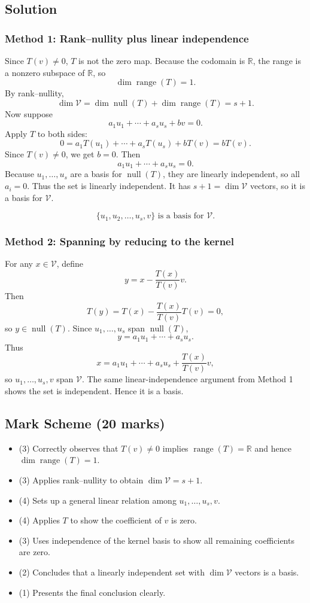 \documentclass[12pt]{article}
\newcommand{\R}{\mathbb{R}}
\newcommand{\V}{\mathcal{V}}
\newcommand{\Null}{\operatorname{null}}
\newcommand{\Range}{\operatorname{range}}
\begin{document}
\subsection{Solution}

\subsubsection{Method 1: Rank--nullity plus linear independence}
Since $T(v)\neq0$, $T$ is not the zero map. Because the codomain is $\R$, the range is a nonzero subspace of $\R$, so
\[
\dim\Range(T)=1.
\]
By rank--nullity,
\[
\dim\V=\dim\Null(T)+\dim\Range(T)=s+1.
\]
Now suppose
\[
a_1u_1+\cdots+a_su_s+bv=0.
\]
Apply $T$ to both sides:
\[
0=a_1T(u_1)+\cdots+a_sT(u_s)+bT(v)=bT(v).
\]
Since $T(v)\neq0$, we get $b=0$. Then
\[
a_1u_1+\cdots+a_su_s=0.
\]
Because $u_1,
\ldots,u_s$ are a basis for $\Null(T)$, they are linearly independent, so all $a_i=0$. Thus the set is linearly independent. It has $s+1=\dim\V$ vectors, so it is a basis for $\V$.

\[
\boxed{\{u_1,u_2,\ldots,u_s,v\}\text{ is a basis for }\V.}
\]

\subsubsection{Method 2: Spanning by reducing to the kernel}
For any $x\in\V$, define
\[
y=x-\frac{T(x)}{T(v)}v.
\]
Then
\[
T(y)=T(x)-\frac{T(x)}{T(v)}T(v)=0,
\]
so $y\in\Null(T)$. Since $u_1,\ldots,u_s$ span $\Null(T)$,
\[
y=a_1u_1+\cdots+a_su_s.
\]
Thus
\[
x=a_1u_1+\cdots+a_su_s+\frac{T(x)}{T(v)}v,
\]
so $u_1,\ldots,u_s,v$ span $\V$. The same linear-independence argument from Method 1 shows the set is independent. Hence it is a basis.

\subsection{Mark Scheme (20 marks)}
\begin{itemize}[leftmargin=1.6em]
  \item (3) Correctly observes that $T(v)\neq0$ implies $\Range(T)=\R$ and hence $\dim\Range(T)=1$.
  \item (3) Applies rank--nullity to obtain $\dim\V=s+1$.
  \item (4) Sets up a general linear relation among $u_1,\ldots,u_s,v$.
  \item (4) Applies $T$ to show the coefficient of $v$ is zero.
  \item (3) Uses independence of the kernel basis to show all remaining coefficients are zero.
  \item (2) Concludes that a linearly independent set with $\dim\V$ vectors is a basis.
  \item (1) Presents the final conclusion clearly.
\end{itemize}
\end{document}

